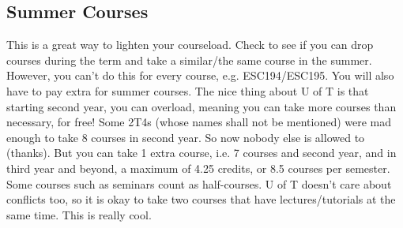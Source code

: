 \subsection{Summer Courses}

This is a great way to lighten your courseload. Check to see if you can drop courses during the term and take a similar/the same course in the summer. However, you can't do this for every course, e.g. ESC194/ESC195. You will also have to pay extra for summer courses. The nice thing about U of T is that starting second year, you can overload, meaning you can take more courses than necessary, for free! Some 2T4s (whose names shall not be mentioned) were mad enough to take 8 courses in second year. So now nobody else is allowed to (thanks). But you can take 1 extra course, i.e. 7 courses and second year, and in third year and beyond, a maximum of 4.25 credits, or 8.5 courses per semester. Some courses such as seminars count as half-courses. U of T doesn't care about conflicts too, so it is okay to take two courses that have lectures/tutorials at the same time. This is really cool.

